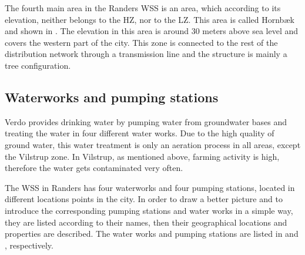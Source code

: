 The fourth main area in the Randers WSS is an area, which according to its elevation, neither belongs to the HZ, nor to the LZ. This area is called Hornbæk and shown in . The elevation in this area is around 30 meters above sea level and covers the western part of the city. This zone is connected to the rest of the distribution network through a transmission line and the structure is mainly a tree configuration. 

\subsection{Waterworks and pumping stations}
\label{waterworks_and_pumping_stations}

Verdo provides drinking water by pumping water from groundwater bases and treating the water in four different water works. Due to the high quality of ground water, this water treatment is only an aeration process in all areas, except the Vilstrup zone. In Vilstrup, as mentioned above, farming activity is high, therefore the water gets contaminated very often. 

The WSS in Randers has four waterworks and four pumping stations, located in different locations points in the city. In order to draw a better picture and to introduce the corresponding pumping stations and water works in a simple way, they are listed according to their names, then their geographical locations and properties are described. The water works and pumping stations are listed in  and , respectively.

